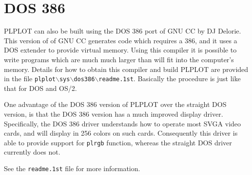 \section{DOS 386}

PLPLOT can also be built using the 
DOS 386 port of GNU CC by DJ Delorie.  This version of of GNU CC 
generates code which requires a 386, and it uses a DOS extender to 
provide virtual memory.  Using this compiler it is possible to write
programs which are much much larger than will fit into the computer's
memory.  Details for how to obtain this compiler and build PLPLOT
are provided in the file
{\tt plplot$\backslash$sys$\backslash$dos386$\backslash$readme.1st}.
Basically the procedure is just like that for DOS and OS/2.

One advantage of the DOS 386 version of PLPLOT over the straight DOS version,
is that the DOS 386 version has a much improved display driver.  Specifically,
the DOS 386 driver understands how to operate most SVGA video cards, and
will display in 256 colors on such cards.  Consequently this driver is
able to provide support for {\tt plrgb} function, whereas the straight DOS
driver currently does not.

See the {\tt readme.1st} file for more information.
